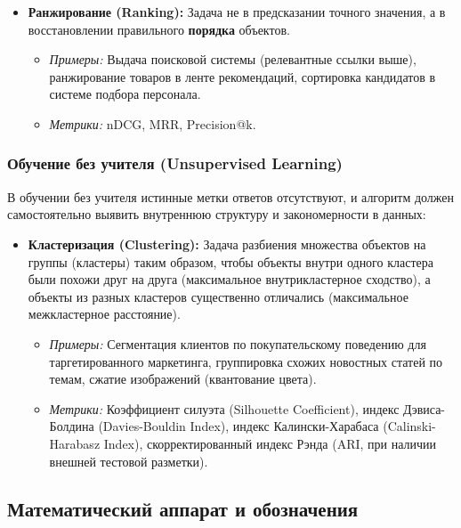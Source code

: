 \documentclass[12pt]{article}
\begin{document}
\begin{itemize}
    \item \textbf{Ранжирование (Ranking):} Задача не в предсказании точного значения, а в восстановлении правильного \textbf{порядка} объектов.
    \begin{itemize}
        \item \textit{Примеры:} Выдача поисковой системы (релевантные ссылки выше), ранжирование товаров в ленте рекомендаций, сортировка кандидатов в системе подбора персонала.
        \item \textit{Метрики:} nDCG, MRR, Precision@k.
    \end{itemize}
\end{itemize}

\subsubsection{Обучение без учителя (Unsupervised Learning)}
В обучении без учителя истинные метки ответов отсутствуют, и алгоритм должен самостоятельно выявить внутреннюю структуру и закономерности в данных:

\begin{itemize}
    \item \textbf{Кластеризация (Clustering):} Задача разбиения множества объектов на группы (кластеры) таким образом, чтобы объекты внутри одного кластера были похожи друг на друга (максимальное внутрикластерное сходство), а объекты из разных кластеров существенно отличались (максимальное межкластерное расстояние).
    \begin{itemize}
        \item \textit{Примеры:} Сегментация клиентов по покупательскому поведению для таргетированного маркетинга, группировка схожих новостных статей по темам, сжатие изображений (квантование цвета).
        \item \textit{Метрики:} Коэффициент силуэта (Silhouette Coefficient), индекс Дэвиса-Болдина (Davies-Bouldin Index), индекс Калински-Харабаса (Calinski-Harabasz Index), скорректированный индекс Рэнда (ARI, при наличии внешней тестовой разметки).
    \end{itemize}
\end{itemize}

\subsection{Математический аппарат и обозначения}
\end{document}
